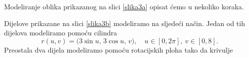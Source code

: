 \documentclass[a4paper,12pt]{article}
\theoremstyle{zad}
\begin{document}
\noindent Modeliranje oblika prikazanog na slici \ref{slika3a} opisat \'cemo u nekoliko koraka.\par\vspace*{5pt}
\begin{figure}[!h]
\centering
{}\hspace*{0.5cm}
\vspace*{-10pt}
\caption{}
\label{slika3}
\end{figure}
\noindent Dijelove prikazane na slici \ref{slika3b} modeliramo na sljede\'ci na\v{c}in. Jedan od tih dijelova modeliramo pomo\'cu cilindra
$$r(u,v)=\big(3\sin{u},\,3\cos{u},\,v\big),\quad u\in[0,2\pi],\ v\in[0,8].$$
Preostala dva dijela modeliramo pomo\'cu rotacijskih ploha tako da krivulje
\end{document}
